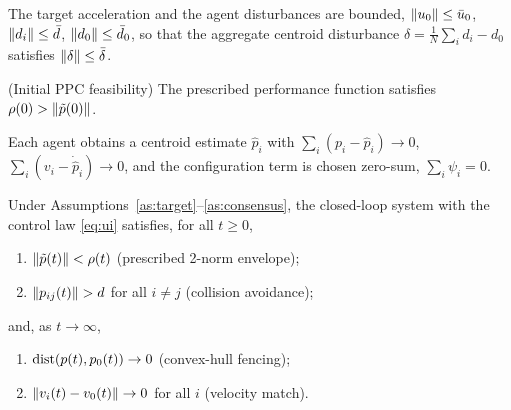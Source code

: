 \begin{assumption}
\label{as:target}
The target acceleration and the agent disturbances are bounded,
$\lVert u_0 \rVert\le\bar u_0$, $\lVert d_i \rVert\le\bar d$, $\lVert d_0 \rVert\le\bar d_0$,
so that the aggregate centroid disturbance
$\delta=\frac1N\sum_i d_i-d_0$ satisfies $\lVert \delta \rVert\le\bar\delta$.
\end{assumption}

\begin{assumption}
\label{as:feas}
(Initial PPC feasibility) The prescribed performance function satisfies
$\rho(0)>\lVert \tilde p(0) \rVert$.
\end{assumption}

\begin{assumption}
\label{as:consensus}
Each agent obtains a centroid estimate $\hat p_i$ with
$\sum_i(p_i-\hat p_i)\to0$, $\sum_i(v_i-\dot{\hat p}_i)\to0$, and the
configuration term is chosen zero-sum, $\sum_i\psi_i=0$.
\end{assumption}

\begin{theorem}
\label{thm:main}
Under Assumptions~\ref{as:target}--\ref{as:consensus}, the closed-loop system
with the control law \eqref{eq:ui} satisfies, for all $t\ge0$,
\begin{enumerate}
    \item[\textbf{P4}] $\lVert \tilde p(t) \rVert<\rho(t)$ (prescribed 2-norm
    envelope);
    \item[\textbf{P2}] $\lVert p_{ij}(t) \rVert>d$ for all $i\neq j$ (collision
    avoidance);
\end{enumerate}
and, as $t\to\infty$,
\begin{enumerate}
    \item[\textbf{P1}] $\mathrm{dist}(p(t),p_0(t))\to0$ (convex-hull fencing);
    \item[\textbf{P3}] $\lVert v_i(t)-v_0(t) \rVert\to0$ for all $i$ (velocity
    match).
\end{enumerate}
\end{theorem}

